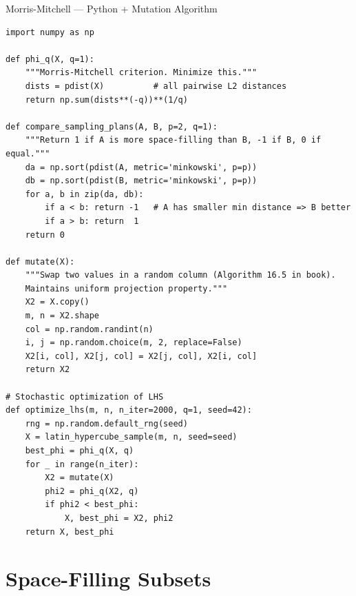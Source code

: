 \documentclass[aspectratio=169,10pt]{beamer}
\begin{document}
\begin{frame}[fragile]{Morris-Mitchell --- Python + Mutation Algorithm}
  \begin{lstlisting}[style=python, caption={Morris-Mitchell criterion + random mutation}]
import numpy as np

def phi_q(X, q=1):
    """Morris-Mitchell criterion. Minimize this."""
    dists = pdist(X)          # all pairwise L2 distances
    return np.sum(dists**(-q))**(1/q)

def compare_sampling_plans(A, B, p=2, q=1):
    """Return 1 if A is more space-filling than B, -1 if B, 0 if equal."""
    da = np.sort(pdist(A, metric='minkowski', p=p))
    db = np.sort(pdist(B, metric='minkowski', p=p))
    for a, b in zip(da, db):
        if a < b: return -1   # A has smaller min distance => B better
        if a > b: return  1
    return 0

def mutate(X):
    """Swap two values in a random column (Algorithm 16.5 in book).
    Maintains uniform projection property."""
    X2 = X.copy()
    m, n = X2.shape
    col = np.random.randint(n)
    i, j = np.random.choice(m, 2, replace=False)
    X2[i, col], X2[j, col] = X2[j, col], X2[i, col]
    return X2

# Stochastic optimization of LHS
def optimize_lhs(m, n, n_iter=2000, q=1, seed=42):
    rng = np.random.default_rng(seed)
    X = latin_hypercube_sample(m, n, seed=seed)
    best_phi = phi_q(X, q)
    for _ in range(n_iter):
        X2 = mutate(X)
        phi2 = phi_q(X2, q)
        if phi2 < best_phi:
            X, best_phi = X2, phi2
    return X, best_phi
  \end{lstlisting}
\end{frame}

\section{Space-Filling Subsets}
\end{document}

